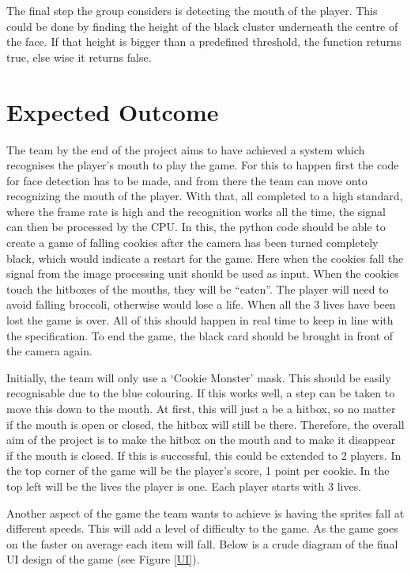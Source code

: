 The final step the group considers is detecting the mouth of the player. This could be done by finding the height of the black cluster underneath the centre of the face. If that height is bigger than a predefined threshold, the function returns true, else wise it returns false.

\section{Expected Outcome}

The team by the end of the project aims to have achieved a system which recognises the player's mouth to play the game. For this to happen first the code for face detection has to be made, and from there the team can move onto recognizing the mouth of the player. With that, all completed to a high standard, where the frame rate is high and the recognition works all the time, the signal can then be processed by the CPU. In this, the python code should be able to create a game of falling cookies after the camera has been turned completely black, which would indicate a restart for the game. Here when the cookies fall the signal from the image processing unit should be used as input. When the cookies touch the hitboxes of the mouths, they will be “eaten”. The player will need to avoid falling broccoli, otherwise would lose a life. When all the 3 lives have been lost the game is over.  All of this should happen in real time to keep in line with the specification. To end the game, the black card should be brought in front of the camera again. 

	Initially, the team will only use a ‘Cookie Monster’ mask. This should be easily recognisable due to the blue colouring. If this works well, a step can be taken to move this down to the mouth. At first, this will just a be a hitbox, so no matter if the mouth is open or closed, the hitbox will still be there. Therefore, the overall aim of the project is to make the hitbox on the mouth and to make it disappear if the mouth is closed. If this is successful, this could be extended to 2 players. In the top corner of the game will be the player's score, 1 point per cookie. In the top left will be the lives the player is one. Each player starts with 3 lives. 

	Another aspect of the game the team wants to achieve is having the sprites fall at different speeds. This will add a level of difficulty to the game. As the game goes on the faster on average each item will fall. Below is a crude diagram of the final UI design of the game (see Figure \ref{UI}). 


